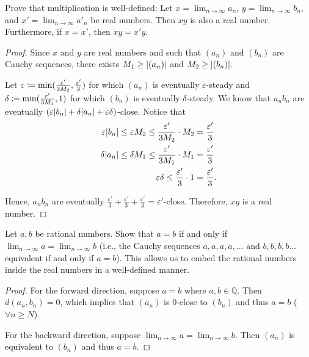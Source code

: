 \begin{exercise}
  Prove that multiplication is well-defined: Let $x = \lim_{n \to \infty}a_n$, $y = \lim_{n \to \infty} b_n$, and $x' = \lim_{n \to \infty} a'_n$ be real numbers.
  Then $xy$ is also a real number. Furthermore, if $x = x'$, then $xy = x'y$.
\end{exercise}
\begin{proof}
  Since $x \text{\ and\ } y$ are real numbers and such that $(a_n) \text{\ and\ } (b_n)$ are Cauchy sequences, there exists $M_1 \geq \abs{(a_n)}$ and $M_2 \geq \abs{(b_n)}$.
  \par Let $\varepsilon \coloneqq \min (\frac{\varepsilon'}{3M_2}, \frac{\varepsilon'}{3})$ for which $(a_n)$ is eventually $\varepsilon$-steady and
  $\delta \coloneqq \min (\frac{\varepsilon'}{3M_1}, 1)$ for which $(b_n)$ is eventually $\delta$-steady.
We know that $a_nb_n$ are eventually $(\varepsilon \abs{b_n} + \delta \abs{a_n} + \varepsilon \delta)$-close. Notice that
\begin{align*}
\varepsilon \abs{b_n} \leq \varepsilon M_2 \leq \frac{\varepsilon'}{3M_2} \cdot M_2 &= \frac{\varepsilon'}{3} \\
\delta \abs{a_n} \leq \delta M_1 \leq \frac{\varepsilon'}{3M_1} \cdot M_1 &= \frac{\varepsilon'}{3} \\
\varepsilon \delta \leq \frac{\varepsilon'}{3} \cdot 1 &= \frac{\varepsilon'}{3}
.\end{align*}
\par Hence, $a_nb_n$ are eventually $\frac{\varepsilon'}{3} + \frac{\varepsilon'}{3} + \frac{\varepsilon'}{3} = \varepsilon'$-close. Therefore, $xy$ is a real number. \par
\end{proof}

\begin{exercise}
  Let $a, b$ be rational numbers. Show that $a = b$ if and only if  $\lim_{n \to \infty} a = \lim_{n \to \infty} b$
  (i.e., the Cauchy sequences $a, a, a, a, \dots \text{\ and\ } b, b, b, b \dots$ equivalent if and only if $a = b$).
  This allows us to embed the rational numbers inside the real numbers in a well-defined manner.
\end{exercise}
\begin{proof}
  For the forward direction, suppose $a = b$ where $a, b \in \mathbb{Q}$. Then $d(a_n, b_n) = 0$, which implies that $(a_n)$ is 0-close to $(b_n)$ and thus $a = b$ ($\forall n \geq N$).
  \par For the backward direction, suppose $\lim_{n \to \infty} a = \lim_{n \to \infty} b$. Then $(a_n)$ is equivalent to $(b_n)$ and thus $a = b$.
\end{proof}


